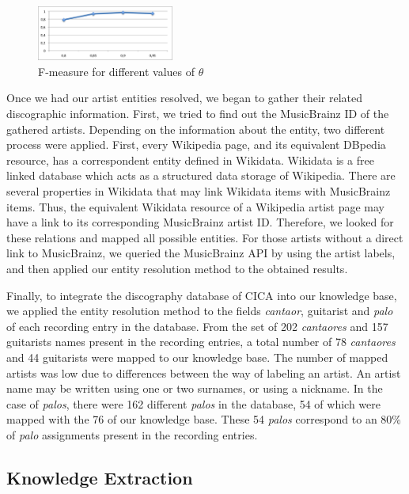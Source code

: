 \begin{figure}
	\centering
	\includegraphics[width=0.40\textwidth]{ch05_musicology_pics/similarity_f.png}
	\caption{F-measure for different values of $\theta$ \label{fig:musicology:fmeasure}}
\end{figure}

Once we had our artist entities resolved, we began to gather their related discographic information. First, we tried to find out the MusicBrainz ID of the gathered artists. Depending on the information about the entity, two different process were applied. First, every Wikipedia page, and its equivalent DBpedia resource, has a correspondent entity defined in Wikidata. Wikidata is a free linked database which acts as a structured data storage of Wikipedia. There are several properties in Wikidata that may link Wikidata items with MusicBrainz items. Thus, the equivalent Wikidata resource of a Wikipedia artist page may have a link to its corresponding MusicBrainz artist ID. Therefore, we looked for these relations and mapped all possible entities. For those artists without a direct link to MusicBrainz, we queried the MusicBrainz API by using the artist labels, and then applied our entity resolution method to the obtained results.

Finally, to integrate the discography database of CICA into our knowledge base, we applied the entity resolution method to the fields \textit{cantaor}, guitarist and \textit{palo} of each recording entry in the database. From the set of 202 \textit{cantaores} and 157 guitarists names present in the recording entries, a total number of 78 \textit{cantaores} and 44 guitarists were mapped to our knowledge base. The number of mapped artists was low due to differences between the way of labeling an artist. An artist name may be written using one or two surnames, or using a nickname. In the case of \textit{palos}, there were 162 different \textit{palos} in the database, 54 of which were mapped with the 76 of our knowledge base. These 54 \textit{palos} correspond to an 80\% of \textit{palo} assignments present in the recording entries.


\subsection{Knowledge Extraction}\label{sec:musicology:kb_extraction}

